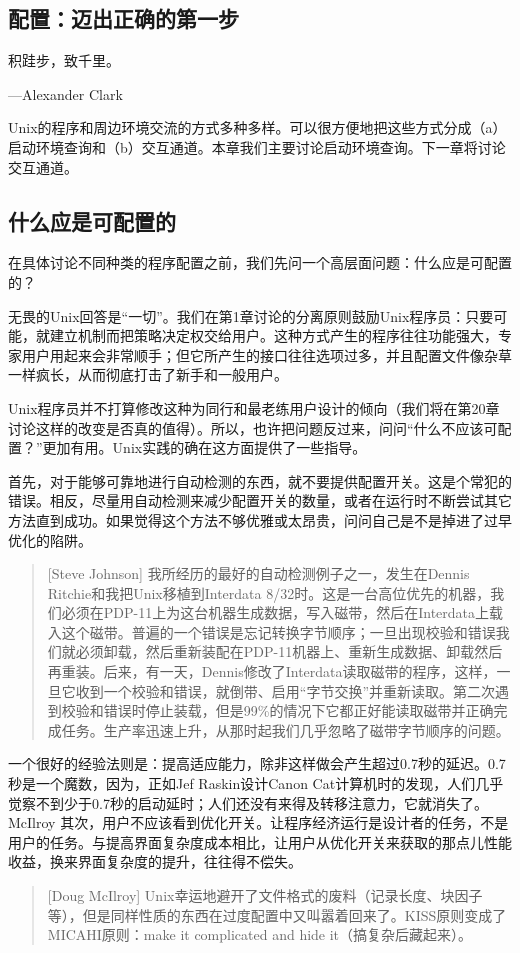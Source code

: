 \documentclass[12pt,oneside]{ctexbook}
\begin{document}
\begin{common-format}
\chapter{配置：迈出正确的第一步}
\begin{flushright}
\begin{notecard}{12em}
积跬步，致千里。

{\hfill —Alexander Clark}
\end{notecard}
\end{flushright}

Unix的程序和周边环境交流的方式多种多样。可以很方便地把这些方式分成（a）启动环境查询和（b）交互通道。本章我们主要讨论启动环境查询。下一章将讨论交互通道。

\section{什么应是可配置的}
在具体讨论不同种类的程序配置之前，我们先问一个高层面问题：什么应是可配置的？

无畏的Unix回答是“一切”。我们在第1章讨论的分离原则鼓励Unix程序员：只要可能，就建立机制而把策略决定权交给用户。这种方式产生的程序往往功能强大，专家用户用起来会非常顺手；但它所产生的接口往往选项过多，并且配置文件像杂草一样疯长，从而彻底打击了新手和一般用户。

Unix程序员并不打算修改这种为同行和最老练用户设计的倾向（我们将在第20章讨论这样的改变是否真的值得）。所以，也许把问题反过来，问问“什么不应该可配置？”更加有用。Unix实践的确在这方面提供了一些指导。

首先，对于能够可靠地进行自动检测的东西，就不要提供配置开关。这是个常犯的错误。相反，尽量用自动检测来减少配置开关的数量，或者在运行时不断尝试其它方法直到成功。如果觉得这个方法不够优雅或太昂贵，问问自己是不是掉进了过早优化的陷阱。

\begin{quote}[Steve Johnson]
我所经历的最好的自动检测例子之一，发生在Dennis Ritchie和我把Unix移植到Interdata 8/32时。这是一台高位优先的机器，我们必须在PDP-11上为这台机器生成数据，写入磁带，然后在Interdata上载入这个磁带。普遍的一个错误是忘记转换字节顺序；一旦出现校验和错误我们就必须卸载，然后重新装配在PDP-11机器上、重新生成数据、卸载然后再重装。后来，有一天，Dennis修改了Interdata读取磁带的程序，这样，一旦它收到一个校验和错误，就倒带、启用“字节交换”并重新读取。第二次遇到校验和错误时停止装载，但是99\%{}的情况下它都正好能读取磁带并正确完成任务。生产率迅速上升，从那时起我们几乎忽略了磁带字节顺序的问题。
\end{quote}

一个很好的经验法则是：提高适应能力，除非这样做会产生超过0.7秒的延迟。0.7秒是一个魔数，因为，正如Jef Raskin设计Canon Cat计算机时的发现，人们几乎觉察不到少于0.7秒的启动延时；人们还没有来得及转移注意力，它就消失了。
McIlroy
其次，用户不应该看到优化开关。让程序经济运行是设计者的任务，不是用户的任务。与提高界面复杂度成本相比，让用户从优化开关来获取的那点儿性能收益，换来界面复杂度的提升，往往得不偿失。
\begin{quote}[Doug McIlroy]
Unix幸运地避开了文件格式的废料（记录长度、块因子等），但是同样性质的东西在过度配置中又叫嚣着回来了。KISS原则变成了MICAHI原则：make it complicated and hide it（搞复杂后藏起来）。
\end{quote}


\end{common-format}
\end{document}
